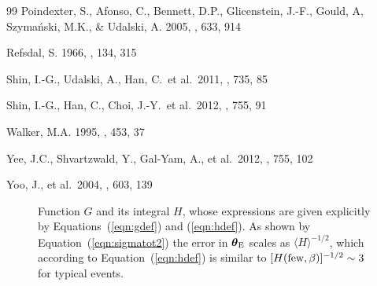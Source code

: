 \documentclass[12pt,preprint]{aastex}
\newcommand{\bdv}[1]{\mbox{\boldmath$#1$}}
\def\e{{\rm E}}
\def\btheta{{\bdv\theta}}
\begin{document}
\begin{thebibliography}{99}
 Poindexter, S., Afonso, C., 
Bennett, D.P., Glicenstein, J.-F., Gould, A, Szyma\'nski, M.K., \& Udalski, A.
2005, \apj, 633, 914

 Refsdal, S. 1966, \mnras, 134, 315

 Shin, I.-G., Udalski, A., Han, C.\ 
et al.\ 2011, \apj, 735, 85

 Shin, I.-G., Han, C., Choi, J.-Y.\ 
et al.\ 2012, \apj, 755, 91 



 Walker, M.A. 1995, \apj, 453, 37



 Yee, J.C., Shvartzwald, Y., Gal-Yam, A.,
et al.\ 2012, \apj, 755, 102

 Yoo, J., et al.\ 2004, \apj, 603, 139


\end{thebibliography}

\begin{figure}
\caption{
\label{fig:g}
Function $G$ and its integral $H$, whose expressions are given explicitly by
Equations~(\ref{eqn:gdef}) and (\ref{eqn:hdef}).  As shown
by Equation~(\ref{eqn:sigmatot2}) the error in $\btheta_\e$ 
scales as $\langle H \rangle^{-1/2}$, which according to 
Equation~(\ref{eqn:hdef}) is similar to 
$[H({\rm few},\beta)]^{-1/2}\sim 3$ for typical events.
}
\end{figure}

\end{document}
